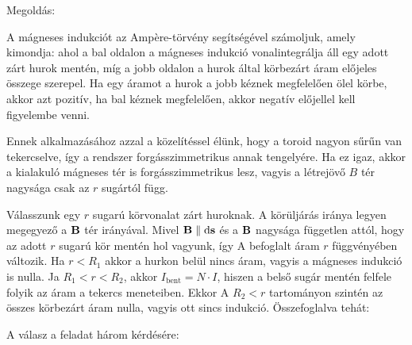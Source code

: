 
\ifdefined\megoldas
  
 Megoldás: 

 A mágneses indukciót az Amp\`ere-törvény segítségével számoljuk, amely kimondja:
 ahol a bal oldalon a mágneses indukció vonalintegrálja áll egy adott zárt hurok mentén, míg a jobb oldalon a hurok által körbezárt áram előjeles összege szerepel. Ha egy áramot a hurok a jobb kéznek megfelelően ölel körbe, akkor azt pozitív, ha bal kéznek megfelelően, akkor negatív előjellel kell figyelembe venni.

 Ennek alkalmazásához azzal a közelítéssel élünk, hogy a toroid nagyon sűrűn van tekercselve, így a rendszer forgásszimmetrikus annak tengelyére. Ha ez igaz, akkor a kialakuló mágneses tér is forgásszimmetrikus lesz, vagyis a létrejövő $B$ tér nagysága csak az $r$ sugártól függ. 

 Válasszunk egy $r$ sugarú körvonalat zárt huroknak. A körüljárás iránya legyen megegyező a $\mathbf{B}$ tér irányával. Mivel $\mathbf{B}\parallel \mathrm{d}\mathbf{s}$ és a $\mathbf{B}$ nagysága független attól, hogy az adott $r$ sugarú kör mentén hol vagyunk, így
 A befoglalt áram $r$ függvényében változik. Ha $r<R_1$ akkor a hurkon belül nincs áram, vagyis a mágneses indukció is nulla. Ja $R_1<r<R_2$, akkor $I_\text{bent} = N\cdot I$, hiszen a belső sugár mentén felfele folyik az áram a tekercs meneteiben. Ekkor
 A $R_2<r$ tartományon szintén az összes körbezárt áram nulla, vagyis ott sincs indukció. Összefoglalva tehát:

 A válasz a feladat három kérdésére:
 
\fi